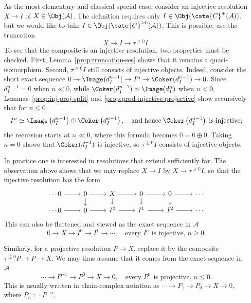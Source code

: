 \begin{example}\label{eg:resolution-single}
	As the most elementary and classical special case, consider an injective
	resolution $X\to I$ of $X\in\Obj(\mathcal{A})$. The definition requires
	only $I\in\Obj(\cate{C}^+(\mathcal{A}))$, but we would like to take
	$I\in\Obj(\cate{C}^{\geq0}(\mathcal{A}))$. This is possible: use the
	truncation
	\[ X \to I \to \tau^{\geq 0} I . \]
	To see that the composite is an injective resolution, two properties must
	be checked. First, Lemma~\ref{prop:truncation-ses} shows that it remains a
	quasi-isomorphism. Second, $\tau^{\geq0}I$ still consists of injective
	objects. Indeed, consider the short exact sequence
	$0\to\Image(d_I^{n-1})\to I^n\to\Coker(d_I^{n-1})\to0$. Since
	$d_I^{n-1}=0$ when $n\ll0$, while
	$\Coker(d_I^{n-1})\simeq\Image(d_I^n)$ when $n<0$,
	Lemmas~\ref{prop:inj-proj-split} and
	\ref{prop:prod-injective-projective} show recursively that for $n\leq0$
	\[ I^n \simeq \Image\left(d_I^{n-1} \right) \oplus \Coker\left( d_I^{n-1} \right) , \quad \text{and hence}\; \Coker\left(d_I^{n-1} \right) \;\text{is injective}; \]
	the recursion starts at $n\ll0$, where this formula becomes
	$0=0\oplus0$. Taking $n=0$ shows that $\Coker(d_I^{-1})$ is injective,
	so $\tau^{\geq0}I$ consists of injective objects.

	In practice one is interested in resolutions that extend sufficiently far.
	The observation above shows that we may replace $X\to I$ by
	$X\to\tau^{\geq0}I$, so that the injective resolution has the form
	\[\begin{tikzcd}[row sep=small]
		\cdots 0 \arrow[r] & 0 \arrow[r] \arrow[d] & X \arrow[d] \arrow[r] & 0 \arrow[r] \arrow[d] & 0 \arrow[r] \arrow[d] & \cdots \\
		\cdots 0 \arrow[r] & 0 \arrow[r] & I^0 \arrow[r] & I^1 \arrow[r] & I^2 \arrow[r] & \cdots
	\end{tikzcd}\]
	This can also be flattened and viewed as the exact sequence in
	$\mathcal{A}$
	\[ 0 \to X \to I^0 \to I^1 \to \cdots, \quad \text{every $I^n$ is injective, $n \geq 0$}. \]

	Similarly, for a projective resolution $P\to X$, replace it by the
	composite $\tau^{\leq0}P\to P\to X$. We may thus assume that it comes
	from the exact sequence in $\mathcal{A}$
	\[ \cdots \to P^{-1} \to P^0 \to X \to 0, \quad \text{every $P^n$ is projective, $n \leq 0$.} \]
	This is usually written in chain-complex notation as
	$\cdots\to P_1\to P_0\to X\to0$, where $P_n:=P^{-n}$.
\end{example}

